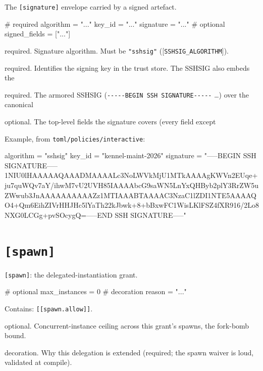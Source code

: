 The \texttt{{[}signature{]}} envelope carried by a signed artefact.

\begin{kennelcode}
[signature]
# required
algorithm = "..."
key_id   = "..."
signature = "..."
# optional
signed_fields = ["..."]
\end{kennelcode}

\begin{description}
\tightlist
\item[\texttt{algorithm}]
required. Signature algorithm. Must be \texttt{"sshsig"}
({[}\texttt{SSHSIG\_ALGORITHM}{]}).
\item[\texttt{key\_id}]
required. Identifies the signing key in the trust store. The SSHSIG also
embeds the
\item[\texttt{signature}]
required. The armored SSHSIG
(\texttt{-\/-\/-\/-\/-BEGIN\ SSH\ SIGNATURE-\/-\/-\/-\/-} \ldots) over
the canonical
\item[\texttt{signed\_fields}]
optional. The top-level fields the signature covers (every field except
\end{description}

Example, from \texttt{toml/policies/interactive}:

\begin{kennelcode}
[signature]
algorithm = "sshsig"
key_id = "kennel-maint-2026"
signature = "-----BEGIN SSH SIGNATURE-----\nU1NIU0lHAAAAAQAAADMAAAALc3NoLWVkMjU1MTkAAAAgKWVn2EUqe+ju7quWQv7aY/ihwM\npBFaipL7vU2UVH85IAAAAbcG9saWN5LnYxQHByb2plY3RrZW5uZWwub3JnAAAAAAAAAAZz\naGE1MTIAAABTAAAAC3NzaC1lZDI1NTE5AAAAQO4+Qm6EihZIVrHHJHc5lYaTh22kJbwk+8\nYVUolVJ+bBxwFC1WisLKlFSZ4fXR916/2Lo8NXG0LCGg+pvSOcygQ=\n-----END SSH SIGNATURE-----\n"
\end{kennelcode}

\hypertarget{spawn}{%
\section{\texorpdfstring{\texttt{{[}spawn{]}}}{{[}spawn{]}}}\label{spawn}}

\texttt{{[}spawn{]}}: the delegated-instantiation grant.

\begin{kennelcode}
[spawn]
# optional
max_instances = 0
# decoration
reason   = "..."
\end{kennelcode}

Contains: \texttt{{[}{[}spawn.allow{]}{]}}.

\begin{description}
\tightlist
\item[\texttt{max\_instances}]
optional. Concurrent-instance ceiling across this grant's spawns, the
fork-bomb bound.
\item[\texttt{reason}]
decoration. Why this delegation is extended (required; the spawn waiver
is loud, validated at compile).
\end{description}

